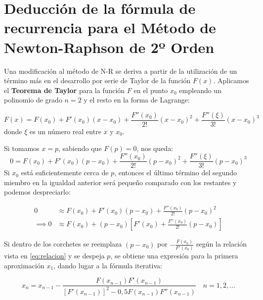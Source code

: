 \documentclass[openany]{book}
\begin{document}
\hypertarget{deducciuxf3n-de-la-fuxf3rmula-de-recurrencia-para-el-muxe9todo-de-newton-raphson-de-2uxba-orden}{%
\section*{Deducción de la fórmula de recurrencia para el Método de Newton-Raphson de 2º Orden}\label{deducciuxf3n-de-la-fuxf3rmula-de-recurrencia-para-el-muxe9todo-de-newton-raphson-de-2uxba-orden}}

Una modificación al método de N-R se deriva a partir de la utilización de un término más en el desarrollo por serie de Taylor de la función \(F(x)\). Aplicamos el \textbf{Teorema de Taylor} para la función \(F\) en el punto \(x_0\) empleando un polinomio de grado \(n=2\) y el resto en la forma de Lagrange:

\[F(x) = F(x_0) + F'(x_0)(x-x_0) + \frac{F''(x_0)}{2!}(x-x_0)^2 + \frac{F''(\xi)}{3!}(x-x_0)^3\]
donde \(\xi\) es un número real entre \(x\) y \(x_0\).

Si tomamos \(x = p\), sabiendo que \(F(p) = 0\), nos queda:
\[0 = F(x_0) + F'(x_0)(p-x_0) + \frac{F''(x_0)}{2!}(p-x_0)^2 + \frac{F''(\xi)}{3!}(p-x_0)^3\]
Si \(x_0\) está suficientemente cerca de \(p\), entonces el último término del segundo miembro en la igualdad anterior será pequeño comparado con los restantes y podemos despreciarlo:

\begin{equation*} 
\begin{split}
0 & \approx F(x_0) + F'(x_0)(p-x_0) + \frac{F''(x_0)}{2!}(p-x_0)^2 \\
\implies 0 & \approx F(x_0) + (p-x_0) \left[ F'(x_0) + \frac{F''(x_0)}{2!}(p-x_0) \right]
\end{split}
\end{equation*}

Si dentro de los corchetes se reemplaza \((p - x_0)\) por \(- \frac{F(x_0)}{F'(x_0)}\) según la relación vista en \eqref{eq:relacion} y se despeja \(p\), se obtiene una expresión para la primera aproximación \(x_1\), dando lugar a la fórmula iterativa:

\[
x_n = x_{n-1} - \frac{F(x_{n-1})F'(x_{n-1})}{[F'(x_{n-1})]^2 - 0,5 F(x_{n-1}) F''(x_{n-1})} \quad n = 1, 2, \dots
\]
\end{document}
